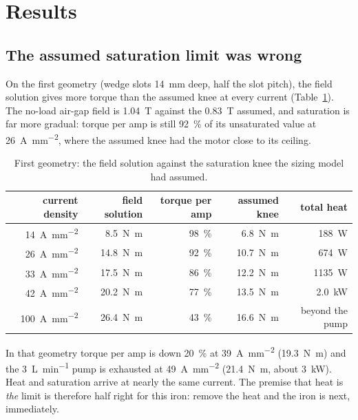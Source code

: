 \documentclass[11pt]{article}
\newcommand{\Amm}{\si{A\per\milli\metre\squared}}
\newcommand{\Nm}{\si{N.m}}
\begin{document}
\section{Results}
\label{sec:results}

\subsection{The assumed saturation limit was wrong}

On the first geometry (wedge slots \SI{14}{mm} deep, half the slot pitch), the
field solution gives more torque than the assumed knee at every current
(Table~\ref{tab:knee}). The no-load air-gap field is \SI{1.04}{T} against the
\SI{0.83}{T} assumed, and saturation is far more gradual: torque per amp is
still \SI{92}{\percent} of its unsaturated value at \SI{26}{\Amm}, where the
assumed knee had the motor close to its ceiling.

\begin{table}[h]
\centering
\begin{tabular}{rrrrr}
\toprule
current density & field solution & torque per amp & assumed knee & total heat\\
\midrule
\SI{14}{\Amm} & \SI{8.5}{\Nm} & \SI{98}{\percent} & \SI{6.8}{\Nm} & \SI{188}{W}\\
\SI{26}{\Amm} & \SI{14.8}{\Nm} & \SI{92}{\percent} & \SI{10.7}{\Nm} & \SI{674}{W}\\
\SI{33}{\Amm} & \SI{17.5}{\Nm} & \SI{86}{\percent} & \SI{12.2}{\Nm} & \SI{1135}{W}\\
\SI{42}{\Amm} & \SI{20.2}{\Nm} & \SI{77}{\percent} & \SI{13.5}{\Nm} & \SI{2.0}{kW}\\
\SI{100}{\Amm} & \SI{26.4}{\Nm} & \SI{43}{\percent} & \SI{16.6}{\Nm} & beyond the pump\\
\bottomrule
\end{tabular}
\caption{First geometry: the field solution against the saturation knee the
sizing model had assumed.}
\label{tab:knee}
\end{table}

In that geometry torque per amp is down \SI{20}{\percent} at \SI{39}{\Amm}
(\SI{19.3}{\Nm}) and the \SI{3}{L\per\minute} pump is exhausted at
\SI{49}{\Amm} (\SI{21.4}{\Nm}, about \SI{3}{kW}). Heat and saturation arrive
at nearly the same current. The premise that heat is \emph{the} limit
is therefore half right for this iron: remove the heat and the iron is next,
immediately.
\end{document}
